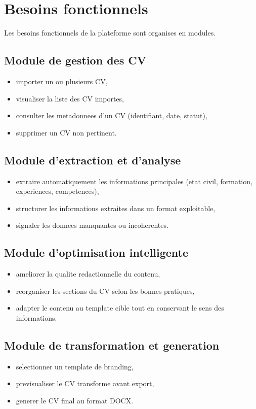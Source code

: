 \section{Besoins fonctionnels}
Les besoins fonctionnels de la plateforme sont organises en modules.

\subsection{Module de gestion des CV}
\begin{itemize}
    \item importer un ou plusieurs CV,
    \item visualiser la liste des CV importes,
    \item consulter les metadonnees d'un CV (identifiant, date, statut),
    \item supprimer un CV non pertinent.
\end{itemize}

\subsection{Module d'extraction et d'analyse}
\begin{itemize}
    \item extraire automatiquement les informations principales (etat civil, formation, experiences, competences),
    \item structurer les informations extraites dans un format exploitable,
    \item signaler les donnees manquantes ou incoherentes.
\end{itemize}

\subsection{Module d'optimisation intelligente}
\begin{itemize}
    \item ameliorer la qualite redactionnelle du contenu,
    \item reorganiser les sections du CV selon les bonnes pratiques,
    \item adapter le contenu au template cible tout en conservant le sens des informations.
\end{itemize}

\subsection{Module de transformation et generation}
\begin{itemize}
    \item selectionner un template de branding,
    \item previsualiser le CV transforme avant export,
    \item generer le CV final au format DOCX.
\end{itemize}

